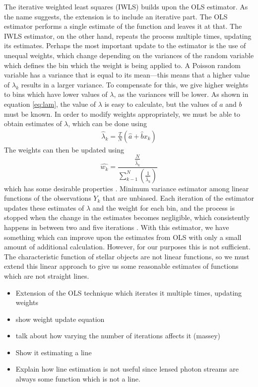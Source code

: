 \documentclass[a4paper,11pt]{article}
\begin{document}
The iterative weighted least squares (IWLS) builds upon the OLS estimator. As
the name suggests, the extension is to include an iterative part. The OLS
estimator performs a single estimate of the function and leaves it at that. The
IWLS estimator, on the other hand, repeats the process multiple times, updating
its estimates. Perhaps the most important update to the estimator is the use of
unequal weights, which change depending on the variances of the random variable
which defines the bin which the weight is being applied to. A Poisson
random variable has a variance that is equal to its mean---this means that a
higher value of ${\lambda}_k$ results in a larger variance. To compensate for
this, we give higher weights to bins which have lower values of $\lambda$, as
the variances will be lower. As shown in equation \eqref{eq:lam}, the value of
$\lambda$ is easy to calculate, but the values of $a$ and $b$ must be known. In
order to modify weights appropriately, we must be able to obtain estimates of
$\lambda$, which can be done using \cite{massey1996estimating}
\begin{align}
\hat{\lambda}_k=\frac{T}{N}(\hat{a}+\hat{b}x_k)
\end{align}
The weights can then be updated using
\begin{equation}
\hat{w_k}=\frac{\displaystyle \frac{N}{\hat{\lambda}_k}}{\displaystyle \sum_{k-1}^N\left(\frac{1}{\hat{\lambda}_k}\right)}
\end{equation}
which has some desirable properties \cite{massey1996estimating}. Minimum
variance estimator among linear functions of the observations $Y_k$ that are
unbiased. Each iteration of the estimator updates these estimates of $\lambda$
and the weight for each bin, and the process is stopped when the change in the
estimates becomes negligible, which consistently happens in between two and five
iterations \cite{massey1996estimating}. With this estimator, we have something
which can improve upon the estimates from OLS with only a small amount of
additional calculation. However, for our purposes this is not sufficient. The
characteristic function of stellar objects are not linear functions, so we must
extend this linear approach to give us some reasonable estimates of functions
which are not straight lines.
\begin{itemize}
\item Extension of the OLS technique which iterates it multiple times, updating weights
\item show weight update equation
\item talk about how varying the number of iterations affects it (massey)
\item Show it estimating a line
\item Explain how line estimation is not useful since lensed photon streams are
  always some function which is not a line.
\end{itemize}
\end{document}
